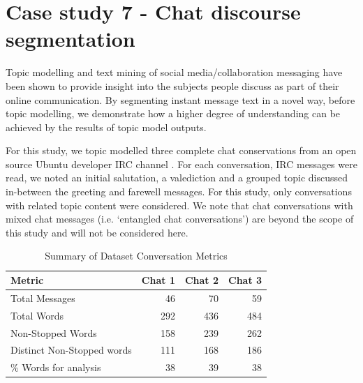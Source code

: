 \section{Case study 7 - Chat discourse segmentation}

Topic modelling and text mining of social media/collaboration messaging have been shown to provide insight into the subjects people discuss as part of their online communication. By segmenting instant message text in a novel way, before topic modelling, we demonstrate how a higher degree of understanding can be achieved by the results of topic model outputs. 

For this study, we topic modelled three complete chat conservations from an open source Ubuntu developer IRC channel \cite{irclogs}. For each conversation, IRC messages were read, we noted an initial salutation, a valediction and a grouped topic discussed in-between the greeting and farewell messages. For this study, only conversations with related topic content were considered. We note that chat conversations with mixed chat messages (i.e. `entangled chat conversations') are beyond the scope of this study and will not be considered here. 

\begin {table}[]
\caption {Summary of Dataset Conversation Metrics} 
\label{tab:chapt7_study1_tab1}
\begin{center}
\begin{tabular}{| p{5.5cm} | p{1.5cm} | p{1.5cm} | p{1.5cm} |} \hline
\textbf{Metric} & \textbf{Chat 1} & \textbf{Chat 2} & \textbf{Chat 3} 
\\ \hline Total Messages & \multicolumn{0}{|r|}{46} & \multicolumn{0}{|r|}{70} & \multicolumn{0}{|r|}{59}
\\ \hline Total Words & \multicolumn{0}{|r|}{292} & \multicolumn{0}{|r|}{436} & \multicolumn{0}{|r|}{484}
\\ \hline Non-Stopped Words & \multicolumn{0}{|r|}{158} & \multicolumn{0}{|r|}{239} & \multicolumn{0}{|r|}{262}
\\ \hline Distinct Non-Stopped words & \multicolumn{0}{|r|}{111} & \multicolumn{0}{|r|}{168} & \multicolumn{0}{|r|}{186}
\\ \hline \% Words for analysis & \multicolumn{0}{|r|}{38} & \multicolumn{0}{|r|}{39} & \multicolumn{0}{|r|}{38} 
\\ \hline
\end{tabular}
\end{center}
\end{table}


